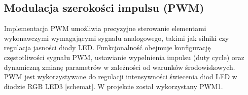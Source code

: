 




\lstset{escapechar=@,style=customc}

\subsection{Modulacja szerokości impulsu (PWM)}
Implementacja PWM umożliwia precyzyjne sterowanie elementami wykonawczymi wymagającymi sygnału analogowego, takimi jak silniki czy regulacja jasności diody LED. Funkcjonalność obejmuje konfigurację częstotliwości sygnału PWM, ustawianie wypełnienia impulsu (duty cycle) oraz dynamiczną zmianę parametrów w zależności od warunków środowiskowych. PWM jest wykorzystywane do regulacji intensywności świecenia diod LED w diodzie RGB LED3 [schemat]. %
W projekcie został wykorzystany PWM1.

